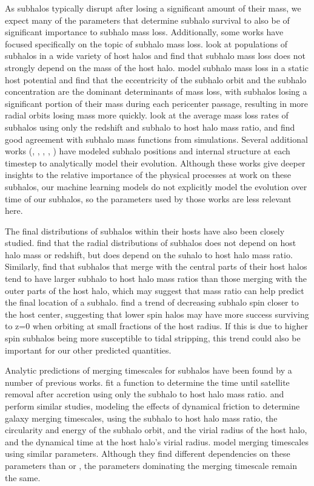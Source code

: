 \documentclass[fleqn,usenatbib]{mnras}
\begin{document}
As subhalos typically disrupt after losing a significant amount of their mass, we expect many of the parameters that determine subhalo survival to also be of significant importance to subhalo mass loss. Additionally, some works have focused specifically on the topic of subhalo mass loss. \citet{Gao2004} look at populations of subhalos in a wide variety of host halos and find that subhalo mass loss does not strongly depend on the mass of the host halo. \citet{Taylor2003} model subhalo mass loss in a static host potential and find that the eccentricity of the subhalo orbit and the subhalo concentration are the dominant determinants of mass loss, with subhalos losing a significant portion of their mass during each pericenter passage, resulting in more radial orbits losing mass more quickly. \citet{VanDenBosch2005} look at the average mass loss rates of subhalos using only the redshift and subhalo to host halo mass ratio, and find good agreement with subhalo mass functions from simulations. Several additional works (\citet{Taylor2001}, \citet{Hayashi2003}, \citet{Kampakoglou2007}, \citet{Gan2010}, \citet{Han2016}) have modeled subhalo positions and internal structure at each timestep to analytically model their evolution. Although these works give deeper insights to the relative importance of the physical processes at work on these subhalos, our machine learning models do not explicitly model the evolution over time of our subhalos, so the parameters used by those works are less relevant here.

The final distributions of subhalos within their hosts have also been closely studied. \citet{Angulo2009} find that the radial distributions of subhalos does not depend on host halo mass or redshift, but does depend on the suhalo to host halo mass ratio. Similarly, \citet{Nipoti2018} find that subhalos that merge with the central parts of their host halos tend to have larger subhalo to host halo mass ratios than those merging with the outer parts of the host halo, which may suggest that mass ratio can help predict the final location of a subhalo. \citet{Reed2005} find a trend of decreasing subhalo spin closer to the host center, suggesting that lower spin halos may have more success surviving to z=0 when orbiting at small fractions of the host radius. If this is due to higher spin subhalos being more susceptible to tidal stripping, this trend could also be important for our other predicted quantities. 

Analytic predictions of merging timescales for subhalos have been found by a number of previous works. \citet{Wetzel2010} fit a function to determine the time until satellite removal after accretion using only the subhalo to host halo mass ratio. \citet{Boylan-Kolchin2007} and \citet{Jiang2007} perform similar studies, modeling the effects of dynamical friction to determine galaxy merging timescales, using the subhalo to host halo mass ratio, the circularity and energy of the subhalo orbit, and the virial radius of the host halo, and the dynamical time at the host halo's virial radius. \citet{McCavana2012} model merging timescales using similar parameters. Although they find different dependencies on these parameters than \citet{Boylan-Kolchin2007} or \citet{Jiang2007}, the parameters dominating the merging timescale remain the same.
\end{document}
